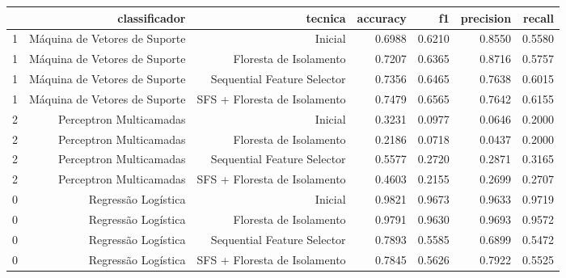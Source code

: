 \begin{tabular}{|l|r|r|r|r|r|r|}
\hline
{} &                  classificador &                       tecnica &  accuracy &      f1 &  precision &  recall \\
\hline
1 &  Máquina de Vetores de Suporte &                       Inicial &    0.6988 &  0.6210 &     0.8550 &  0.5580 \\
1 &  Máquina de Vetores de Suporte &        Floresta de Isolamento &    0.7207 &  0.6365 &     0.8716 &  0.5757 \\
1 &  Máquina de Vetores de Suporte &   Sequential Feature Selector &    0.7356 &  0.6465 &     0.7638 &  0.6015 \\
1 &  Máquina de Vetores de Suporte &  SFS + Floresta de Isolamento &    0.7479 &  0.6565 &     0.7642 &  0.6155 \\
2 &        Perceptron Multicamadas &                       Inicial &    0.3231 &  0.0977 &     0.0646 &  0.2000 \\
2 &        Perceptron Multicamadas &        Floresta de Isolamento &    0.2186 &  0.0718 &     0.0437 &  0.2000 \\
2 &        Perceptron Multicamadas &   Sequential Feature Selector &    0.5577 &  0.2720 &     0.2871 &  0.3165 \\
2 &        Perceptron Multicamadas &  SFS + Floresta de Isolamento &    0.4603 &  0.2155 &     0.2699 &  0.2707 \\
0 &            Regressão Logística &                       Inicial &    0.9821 &  0.9673 &     0.9633 &  0.9719 \\
0 &            Regressão Logística &        Floresta de Isolamento &    0.9791 &  0.9630 &     0.9693 &  0.9572 \\
0 &            Regressão Logística &   Sequential Feature Selector &    0.7893 &  0.5585 &     0.6899 &  0.5472 \\
0 &            Regressão Logística &  SFS + Floresta de Isolamento &    0.7845 &  0.5626 &     0.7922 &  0.5525 \\
\hline
\end{tabular}
